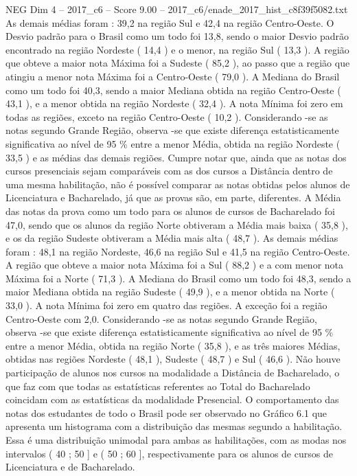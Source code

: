 \begin{textsample}{NEG Dim 4 – 2017\_c6 – Score 9.00 – 2017\_c6/enade\_2017\_hist\_c8f39f5082.txt}
As demais médias foram : 39,2 na região Sul e 42,4 na região Centro-Oeste.
O Desvio padrão para o Brasil como um todo foi 13,8, sendo o maior Desvio padrão encontrado na região Nordeste ( 14,4 ) e o menor, na região Sul ( 13,3 ).
A região que obteve a maior nota Máxima foi a Sudeste ( 85,2 ), ao passo que a região que atingiu a menor nota Máxima foi a Centro-Oeste ( 79,0 ).
A Mediana do Brasil como um todo foi 40,3, sendo a maior Mediana obtida na região Centro-Oeste ( 43,1 ), e a menor obtida na região Nordeste ( 32,4 ).
A nota Mínima foi zero em todas as regiões, exceto na região Centro-Oeste ( 10,2 ).
Considerando -se as notas segundo Grande Região, observa -se que existe diferença estatisticamente significativa ao nível de 95 \% entre a menor Média, obtida na região Nordeste ( 33,5 ) e as médias das demais regiões.
Cumpre notar que, ainda que as notas dos cursos presenciais sejam comparáveis com as dos cursos a Distância dentro de uma mesma habilitação, não é possível comparar as notas obtidas pelos alunos de Licenciatura e Bacharelado, já que as provas são, em parte, diferentes.
A Média das notas da prova como um todo para os alunos de cursos de Bacharelado foi 47,0, sendo que os alunos da região Norte obtiveram a Média mais baixa ( 35,8 ), e os da região Sudeste obtiveram a Média mais alta ( 48,7 ).
As demais médias foram : 48,1 na região Nordeste, 46,6 na região Sul e 41,5 na região Centro-Oeste.
A região que obteve a maior nota Máxima foi a Sul ( 88,2 ) e a com menor nota Máxima foi a Norte ( 71,3 ).
A Mediana do Brasil como um todo foi 48,3, sendo a maior Mediana obtida na região Sudeste ( 49,9 ), e a menor obtida na Norte ( 33,0 ).
A nota Mínima foi zero em quatro das regiões.
A exceção foi a região Centro-Oeste com 2,0.
Considerando -se as notas segundo Grande Região, observa -se que existe diferença estatisticamente significativa ao nível de 95 \% entre a menor Média, obtida na região Norte ( 35,8 ), e as três maiores Médias, obtidas nas regiões Nordeste ( 48,1 ), Sudeste ( 48,7 ) e Sul ( 46,6 ).
Não houve participação de alunos nos cursos na modalidade a Distância de Bacharelado, o que faz com que todas as estatísticas referentes ao Total do Bacharelado coincidam com as estatísticas da modalidade Presencial.
O comportamento das notas dos estudantes de todo o Brasil pode ser observado no Gráfico 6.1 que apresenta um histograma com a distribuição das mesmas segundo a habilitação.
Essa é uma distribuição unimodal para ambas as habilitações, com as modas nos intervalos ( 40 ; 50 ] e ( 50 ; 60 ], respectivamente para os alunos de cursos de Licenciatura e de Bacharelado.

\end{textsample}
